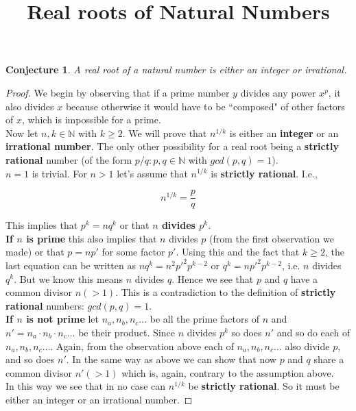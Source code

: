 \documentclass{article}
\title{Real roots of Natural Numbers}
\newtheorem*{conjecture}{Conjecture}
\newtheorem*{corollary}{Corollary}
\begin{document}
\maketitle

\begin{conjecture}A real root of a natural number is either
    an integer or irrational.
\end{conjecture}
\begin{proof}We begin by observing that if a prime number $y$ 
    divides any power $x^p$, it also divides 
    $x$ because otherwise it would have to be ``composed" of other
    factors of $x$, which is impossible for a prime.\\

    Now let $n,k\in\mathbb{N}$ with $k\ge{2}$. We will prove 
    that $n^{1/k}$ is either an \textbf{integer} 
    or an \textbf{irrational number}. The only other possibility
    for a real root being a \textbf{strictly rational} number
    (of the form $p/q: p,q\in \mathbb{N}$ with $gcd(p,q) = 1$).\\

    $n=1$ is trivial. For $n>1$ let's assume that 
    $n^{1/k}$ is \textbf{strictly rational}. I.e.,
    
    $$n^{1/k} = \frac{p}{q}$$

    This implies that $p^k = nq^k$ or that 
    \textbf{$n$ divides $p^k$}.\\

    \textbf{If $n$ is prime}
    this also implies that $n$ divides $p$ (from the first observation we made)
    or that $p=np'$ for some factor $p'$.
    Using this and the fact that $k\ge{2}$, the last
    equation can be written as $nq^k = n^2{p'}^2 p^{k-2}$
    or $q^k = n{p'}^2 p^{k-2}$, i.e. $n$ divides $q^k$. 
    But we know this means $n$ divides $q$. Hence we see that
    $p$ and $q$ have a common divisor $n(>1)$. This is a contradiction
    to the definition of \textbf{strictly rational} numbers:
    $gcd(p,q)=1$.\\

    \textbf{If $n$ is not prime}
    let $n_a,n_b,n_c\dots$ be all the prime factors of $n$
    and $n' = n_a \cdot n_b \cdot n_c\dots$ be their product.
    Since $n$ divides $p^k$ so does $n'$ and so do each of $n_a,n_b,n_c\dots$.
    Again, from the observation above each of $n_a,n_b,n_c\dots$
    also divide $p$, and so does $n'$. In the same way as above
    we can show that now $p$ and $q$ share a common divisor
    $n'(>1)$ which is, again, contrary to the assumption above.\\

    In this way we see that in no case can $n^{1/k}$ be
    \textbf{strictly rational}. 
    So it must be either an integer or an irrational number.
\end{proof}
    
% 
    
\end{document}
